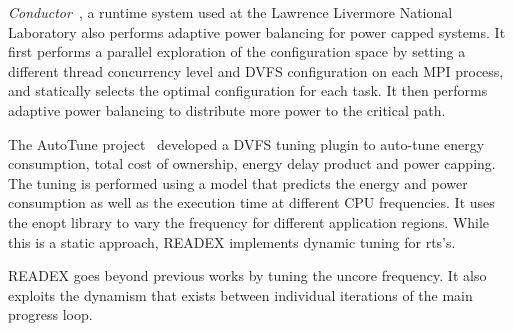 \textit{Conductor}~\cite{Marathe}, a runtime system used at the Lawrence Livermore National Laboratory also performs adaptive power balancing for power capped systems. It first performs a parallel exploration of the configuration space by setting a different thread concurrency level and DVFS configuration on each MPI process, and statically selects the optimal configuration for each task. It then performs adaptive power balancing to distribute more power to the critical path.

The AutoTune project~\cite{guillen2016dvfs,AutoTune:Book2015} developed a DVFS tuning plugin to auto-tune energy consumption, total cost of ownership, energy delay product and power capping. The tuning is performed using a model that predicts the energy and power consumption as well as the execution time at different CPU frequencies. It uses the enopt library to vary the frequency for different application regions. While this is a static approach, READEX implements dynamic tuning for rts's.

READEX goes beyond previous works by tuning the uncore frequency. It also exploits the dynamism that exists between individual iterations of the main progress loop.

